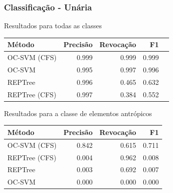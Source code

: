 \documentclass[t]{beamer}
\begin{document}
\begin{frame}[c]
	\frametitle{Classificação - Unária}

	\centering
	Resultados para todas as classes

	\small{
		\begin{table}[h]
		\centering
		\begin{tabulary}{\linewidth}{|L|R|R|R|R|}
		\hline
		\textbf{Método} & \textbf{Precisão} & \textbf{Revocação} & \textbf{F1} \\ \hline
		OC-SVM (CFS)  & 0.999 & 0.999 & 0.999 \\ \hline
		OC-SVM        & 0.995 & 0.997 & 0.996 \\ \hline
		REPTree       & 0.996 & 0.465 & 0.632 \\ \hline
		REPTree (CFS) & 0.997 & 0.384 & 0.552 \\ \hline
		\end{tabulary}
		\end{table}
	}

	\centering
	Resultados para a classe de elementos antrópicos

	\small{
		\begin{table}[h]
		\centering
		\begin{tabulary}{\linewidth}{|L|R|R|R|}
		\hline
		\textbf{Método} & \textbf{Precisão} & \textbf{Revocação} & \textbf{F1} \\ \hline
		OC-SVM (CFS)  & 0.842 & 0.615 & 0.711 \\ \hline
		REPTree (CFS) & 0.004 & 0.962 & 0.008 \\ \hline
		REPTree       & 0.003 & 0.692 & 0.007 \\ \hline
		OC-SVM        & 0.000 & 0.000 & 0.000 \\ \hline
		\end{tabulary}
		\end{table}
	}
\end{frame}
\end{document}
